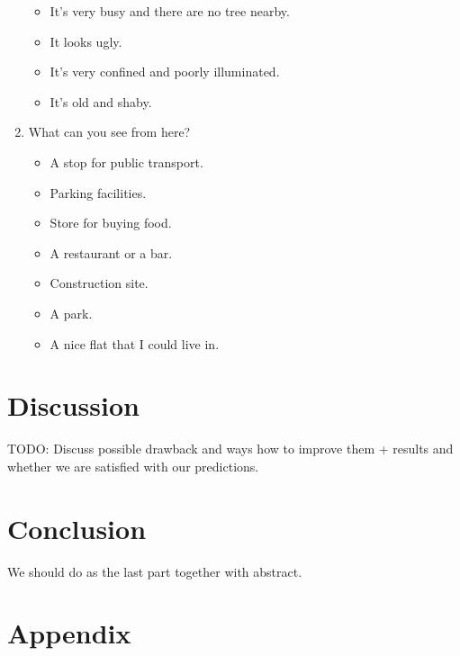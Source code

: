 \documentclass[letterpaper]{article}
\begin{document}
\begin{enumerate}
\begin{itemize}
		\item It's very busy and there are no tree nearby.
		\item It looks ugly.
		\item It's very confined and poorly illuminated.
		\item It's old and shaby.
	\end{itemize}
	\item What can you see from here?
	\begin{itemize}
		\item A stop for public transport.
		\item Parking facilities.
		\item Store for buying food.
		\item A restaurant or a bar.
		\item Construction site.
		\item A park.
		\item A nice flat that I could live in.
	\end{itemize}
\end{enumerate}



\section{Discussion}\label{sec:discussion}
TODO: Discuss possible drawback and ways how to improve them + results and whether we are satisfied with our predictions.

\section{Conclusion}
We should do as the last part together with abstract.




\section{Appendix}
\end{document}

